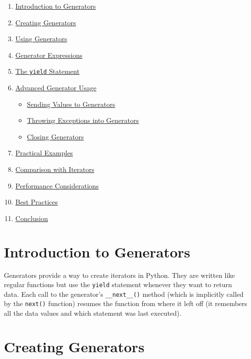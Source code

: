 \documentclass[
  letterpaper,
  DIV=11,
  numbers=noendperiod]{scrreprt}
\providecommand{\tightlist}{%
  \setlength{\itemsep}{0pt}\setlength{\parskip}{0pt}}\usepackage{longtable,booktabs,array}
\begin{document}
\begin{enumerate}
\def\labelenumi{\arabic{enumi}.}
\tightlist
\item
  \hyperref[introduction-to-generators]{Introduction to Generators}
\item
  \hyperref[creating-generators]{Creating Generators}
\item
  \hyperref[using-generators]{Using Generators}
\item
  \hyperref[generator-expressions]{Generator Expressions}
\item
  \hyperref[the-yield-statement]{The \texttt{yield} Statement}
\item
  \hyperref[advanced-generator-usage]{Advanced Generator Usage}

  \begin{itemize}
  \tightlist
  \item
    \hyperref[sending-values-to-generators]{Sending Values to
    Generators}
  \item
    \hyperref[throwing-exceptions-into-generators]{Throwing Exceptions
    into Generators}
  \item
    \hyperref[closing-generators]{Closing Generators}
  \end{itemize}
\item
  \hyperref[practical-examples]{Practical Examples}
\item
  \hyperref[comparison-with-iterators]{Comparison with Iterators}
\item
  \hyperref[performance-considerations]{Performance Considerations}
\item
  \hyperref[best-practices]{Best Practices}
\item
  \hyperref[conclusion]{Conclusion}
\end{enumerate}

\section{Introduction to Generators}\label{introduction-to-generators}

Generators provide a way to create iterators in Python. They are written
like regular functions but use the \texttt{yield} statement whenever
they want to return data. Each call to the generator's
\texttt{\_\_next\_\_()} method (which is implicitly called by the
\texttt{next()} function) resumes the function from where it left off
(it remembers all the data values and which statement was last
executed).

\section{Creating Generators}\label{creating-generators}
\end{document}
